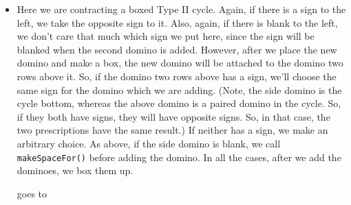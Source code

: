 \documentclass[12pt]{article}
\numberwithin{equation}{section}
\newcommand{\horizontalDominoRS}[3]{\filldraw [dominoRSStyle] (#2 - 1 + \eps, #1 - 1 + \eps) rectangle + (2 - \teps, 1 -\teps) node [dominoText] {$#3$};}
\newcommand{\verticalDominoRSShift}[4]{\filldraw [dominoRSStyle] (#2 - 1 + #4 + \eps,  #1 - 1 + \eps) rectangle + (1 - \teps,2 -\teps) node [dominoText] {$#3$};}
\begin{document}
\begin{itemize}
\begin{itemize}
\begin{figure}[H]
      \end{figure}

      \item Here we are contracting a boxed Type II cycle.
      Again, if there is a sign to the left, we take the opposite sign to it.
      Also, again, if there is blank to the left, we don't care that much which sign we put here, since the sign will be blanked when the second domino is added.
      However, after we place the new domino and make a box, the new domino will be attached to the domino two rows above it.
      So, if the domino two rows above has a sign, we'll choose the same sign for the domino which we are adding.
      (Note, the side domino is the cycle bottom, whereas the above domino is a paired domino in the cycle.
      So, if they both have signs, they will have opposite signs.
      So, in that case, the two prescriptions have the same result.)
      If neither has a sign, we make an arbitrary choice.
      As above, if the side domino is blank, we call
      \texttt{makeSpaceFor()} before adding the domino.
      In all the cases, after we add the dominoes, we box them up.
      \begin{figure}[H]
        \centering
      \end{figure}
      goes to
      \begin{figure}[H]
        \centering
\end{figure}
\end{itemize}
\end{itemize}
\end{document}

